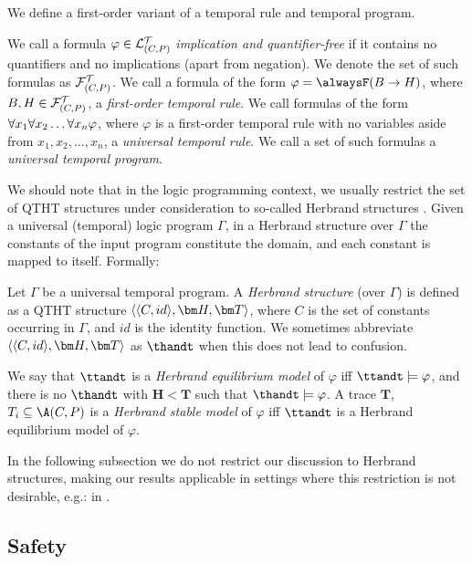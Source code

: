 We define a first-order variant of a temporal rule and temporal program.

\begin{definition}
  We call a formula $\varphi \in \mathcal{L}_{(C,P)}^\mathcal{T}$ \emph{implication and
    quantifier-free} if it contains no quantifiers and no implications
  (apart from negation). We denote the set of such formulas as
  $\mathcal{F}_{(C,P)}^\mathcal{T}$. We call a formula of the form $\varphi=\tempruleshort$,
  where $B, H \in \mathcal{F}_{(C,P)}^\mathcal{T}$, a \emph{first-order temporal rule}. We
  call formulas of the form $\forall x_1 \forall x_2 \dots \forall x_n \varphi$, where $\varphi$ is a
  first-order temporal rule with no variables aside from
  $x_1, x_2, \dots, x_n$, a \emph{universal temporal rule}. We call a
  set of such formulas a \emph{universal temporal program}.
\end{definition}

We should note that in the logic programming context, we usually
restrict the set of QTHT structures under consideration to so-called
Herbrand structures \cite{peaval06a}. Given a universal (temporal)
logic program $\Gamma$, in a Herbrand structure over $\Gamma$ the
constants of the input program constitute the domain, and each
constant is mapped to itself. Formally:

\begin{definition}
  Let $\Gamma$ be a universal temporal program. A \emph{Herbrand
    structure} (over $\Gamma$) is defined as a QTHT structure
  $\herbrandhandt$, where $C$ is the set of constants occurring in
  $\Gamma$, and $id$ is the identity function. We sometimes abbreviate
  $\herbrandhandt$ as $\thandt$ when this does not lead to confusion.

  We say that $\ttandt$ is a \emph{Herbrand equilibrium model} of
  $\varphi$ iff $\ttandt \models \varphi$, and there is no $\thandt$
  with $\bm{H} < \bm{T}$ such that $\thandt \models \varphi$. A trace
  $\bm{T}$, $T_i \subseteq \A(C,P)$ is a \emph{Herbrand stable model}
  of $\varphi$ iff $\ttandt$ is a Herbrand equilibrium model of
  $\varphi$.
\end{definition}

In the following subsection we do not restrict our discussion to
Herbrand structures, making our results applicable in settings where
this restriction is not desirable, e.g.: in \cite{henive08a}.

\subsection{Safety}

